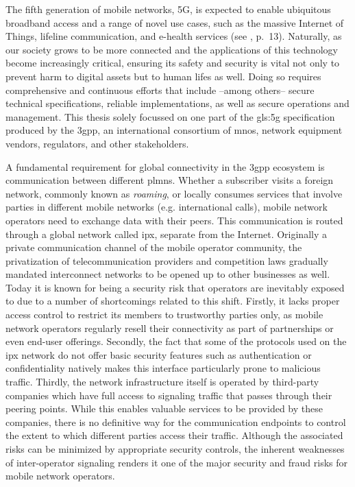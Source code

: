 The fifth generation of mobile networks, 5G, is expected to enable ubiquitous broadband access and a range of novel use cases, such as the massive Internet of Things, lifeline communication, and e-health services (see \cite{ngmn5Gwhite}, p.~13).
Naturally, as our society grows to be more connected and the applications of this technology become increasingly critical, ensuring its safety and security is vital not only to prevent harm to digital assets but to human lifes as well.
Doing so requires comprehensive and continuous efforts that include --among others-- secure technical specifications, reliable implementations, as well as secure operations and management.
This thesis solely focussed on one part of the \gls{gls:5g} specification produced by the \gls{3gpp}, an international consortium of \glspl{mno}, network equipment vendors, regulators, and other stakeholders.

A fundamental requirement for global connectivity in the \gls{3gpp} ecosystem is communication between different \glspl{plmn}.
Whether a subscriber visits a foreign network, commonly known as \textit{roaming}, or locally consumes services that involve parties in different mobile networks (e.g. international calls), mobile network operators need to exchange data with their peers.
This communication is routed through a global network called \gls{ipx}, separate from the Internet.
Originally a private communication channel of the mobile operator community, the privatization of telecommunication providers and competition laws gradually mandated interconnect networks to be opened up to other businesses as well.
Today it is known for being a security risk that operators are inevitably exposed to due to a number of shortcomings related to this shift.
Firstly, it lacks proper access control to restrict its members to trustworthy parties only, as mobile network operators regularly resell their connectivity as part of partnerships or even end-user offerings.
Secondly, the fact that some of the protocols used on the \gls{ipx} network do not offer basic security features such as authentication or confidentiality natively makes this interface particularly prone to malicious traffic.
Thirdly, the network infrastructure itself is operated by third-party companies which have full access to signaling traffic that passes through their peering points.
While this enables valuable services to be provided by these companies, there is no definitive way for the communication endpoints to control the extent to which different parties access their traffic.
Although the associated risks can be minimized by appropriate security controls, the inherent weaknesses of inter-operator signaling renders it one of the major security and fraud risks for mobile network operators.

